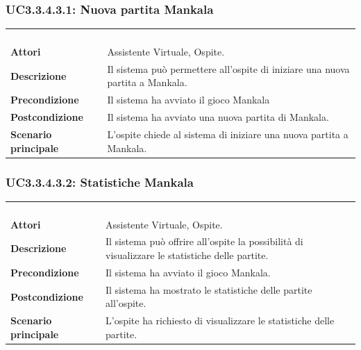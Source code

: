 \subsubsection{UC3.3.4.3.1: Nuova partita Mankala}
\label{UC3.3.4.3.1}
\begin{longtable}{l|p{10cm}}
	\rowcolor[gray]{0.8} \multicolumn{2}{c}{} \\
	\rowcolor[gray]{0.8} \multicolumn{2}{c}{\textbf{UC3.3.4.3.1 - Nuova partita Mankala}} \\
	\rowcolor[gray]{0.8} \multicolumn{2}{c}{} \\
	\hline
	&\\
	\textbf{Attori} & Assistente Virtuale, Ospite.\\[7pt]
	\textbf{Descrizione} & Il sistema può permettere all'ospite di iniziare una nuova partita a Mankala.\\[7pt]
	\textbf{Precondizione} & Il sistema ha avviato il gioco Mankala\\[7pt]
	\textbf{Postcondizione} & Il sistema ha avviato una nuova partita di Mankala.\\[7pt]
	\textbf{Scenario principale} &L'ospite chiede al sistema di iniziare una nuova partita a Mankala.\\[7pt]\hline
\end{longtable}

\subsubsection{UC3.3.4.3.2: Statistiche Mankala}
\label{UC3.3.4.3.2}
\begin{longtable}{l|p{10cm}}
	\rowcolor[gray]{0.8} \multicolumn{2}{c}{} \\
	\rowcolor[gray]{0.8} \multicolumn{2}{c}{\textbf{UC3.3.4.3.2 - Statistiche Mankala}} \\
	\rowcolor[gray]{0.8} \multicolumn{2}{c}{} \\
	\hline
	&\\
	\textbf{Attori} & Assistente Virtuale, Ospite.\\[7pt]
	\textbf{Descrizione} & Il sistema può offrire all'ospite la possibilità di visualizzare le statistiche delle partite.\\[7pt]
	\textbf{Precondizione} & Il sistema ha avviato il gioco Mankala.\\[7pt]
	\textbf{Postcondizione} & Il sistema ha mostrato le statistiche delle partite all'ospite.\\[7pt]
	\textbf{Scenario principale} &L'ospite ha richiesto di visualizzare le statistiche delle partite.\\[7pt]\hline
\end{longtable}

